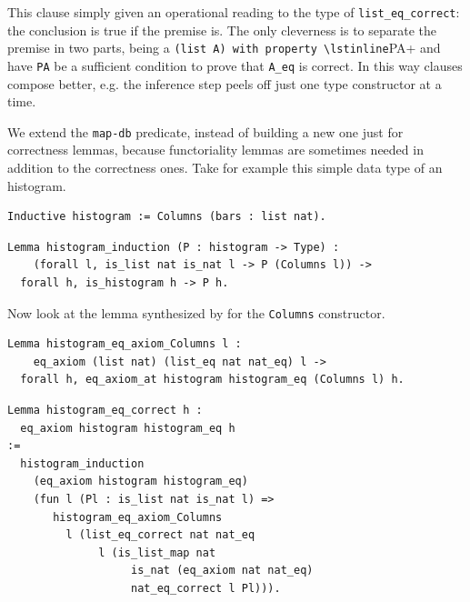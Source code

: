 \documentclass[sigplan,10pt,review]{acmart}\settopmatter{printfolios=true,printccs=false,printacmref=false}
\newcommand{\derive}[1]{\keys{#1}}
\begin{document}
\noindent
This clause simply given an operational reading to the type
of \lstinline+list_eq_correct+: the conclusion is true if the premise
is. The only cleverness is to separate the premise in two parts,
being a \lstinline+(list A) with property \lstinline+PA+ and have
\lstinline+PA+ be a sufficient condition to prove that \lstinline+A_eq+
is correct. In this way clauses compose better, e.g. the
inference step peels off just one type constructor at a time.

We extend the \lstinline+map-db+ predicate, instead of building
a new one just for correctness lemmas, because functoriality lemmas
are sometimes needed in addition to the correctness ones.
Take for example this simple data type of an histogram.

\begin{minipage}{\textwidth}\begin{lstlisting}
Inductive histogram := Columns (bars : list nat).
\end{lstlisting}\end{minipage}

\begin{minipage}{\textwidth}\begin{lstlisting}
Lemma histogram_induction (P : histogram -> Type) :
    (forall l, is_list nat is_nat l -> P (Columns l)) ->
  forall h, is_histogram h -> P h.
\end{lstlisting}\end{minipage}

Now look at the lemma synthesized by \derive{eqK}
for the \lstinline+Columns+ constructor.

\begin{minipage}{\textwidth}\begin{lstlisting}
Lemma histogram_eq_axiom_Columns l :
    eq_axiom (list nat) (list_eq nat nat_eq) l ->
  forall h, eq_axiom_at histogram histogram_eq (Columns l) h.
\end{lstlisting}\end{minipage}

\begin{minipage}{\textwidth}\begin{lstlisting}
Lemma histogram_eq_correct h :
  eq_axiom histogram histogram_eq h
:=
  histogram_induction 
    (eq_axiom histogram histogram_eq)
    (fun l (Pl : is_list nat is_nat l) =>
       histogram_eq_axiom_Columns
         l (list_eq_correct nat nat_eq
              l (is_list_map nat
                   is_nat (eq_axiom nat nat_eq)
                   nat_eq_correct l Pl))).
\end{lstlisting}\end{minipage}
\end{document}
